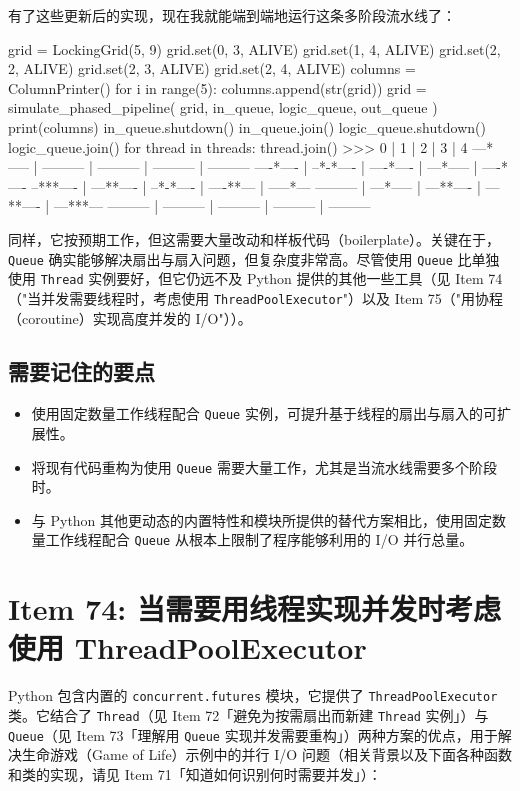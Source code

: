 有了这些更新后的实现，现在我就能端到端地运行这条多阶段流水线了：

\begin{codebox}[python]
grid = LockingGrid(5, 9)
grid.set(0, 3, ALIVE)
grid.set(1, 4, ALIVE)
grid.set(2, 2, ALIVE)
grid.set(2, 3, ALIVE)
grid.set(2, 4, ALIVE)
columns = ColumnPrinter()
for i in range(5):
    columns.append(str(grid))
    grid = simulate_phased_pipeline(
        grid, in_queue, logic_queue, out_queue
    )
print(columns)
in_queue.shutdown()
in_queue.join()
logic_queue.shutdown()
logic_queue.join()
for thread in threads:
    thread.join()
>>>
    0     |     1     |     2     |     3     |     4
---*----- | --------- | --------- | --------- | ---------
----*---- | --*-*---- | ----*---- | ---*----- | ----*----
--***---- | ---**---- | --*-*---- | ----**--- | -----*---
--------- | ---*----- | ---**---- | ---**---- | ---***---
--------- | --------- | --------- | --------- | ---------
\end{codebox}

同样，它按预期工作，但这需要大量改动和样板代码（boilerplate）。关键在于，\texttt{Queue} 确实能够解决扇出与扇入问题，但复杂度非常高。尽管使用 \texttt{Queue} 比单独使用 \texttt{Thread} 实例要好，但它仍远不及 Python 提供的其他一些工具（见 Item 74（"当并发需要线程时，考虑使用 \texttt{ThreadPoolExecutor}"）以及 Item 75（"用协程（coroutine）实现高度并发的 I/O"））。

\subsection{需要记住的要点}

\begin{itemize}
\item 使用固定数量工作线程配合 \texttt{Queue} 实例，可提升基于线程的扇出与扇入的可扩展性。
\item 将现有代码重构为使用 \texttt{Queue} 需要大量工作，尤其是当流水线需要多个阶段时。
\item 与 Python 其他更动态的内置特性和模块所提供的替代方案相比，使用固定数量工作线程配合 \texttt{Queue} 从根本上限制了程序能够利用的 I/O 并行总量。
\end{itemize}

\section{Item 74: 当需要用线程实现并发时考虑使用 ThreadPoolExecutor}

Python 包含内置的 \texttt{concurrent.futures} 模块，它提供了 \texttt{ThreadPoolExecutor} 类。它结合了 \texttt{Thread}（见 Item 72「避免为按需扇出而新建 \texttt{Thread} 实例」）与 \texttt{Queue}（见 Item 73「理解用 \texttt{Queue} 实现并发需要重构」）两种方案的优点，用于解决生命游戏（Game of Life）示例中的并行 I/O 问题（相关背景以及下面各种函数和类的实现，请见 Item 71「知道如何识别何时需要并发」）：

